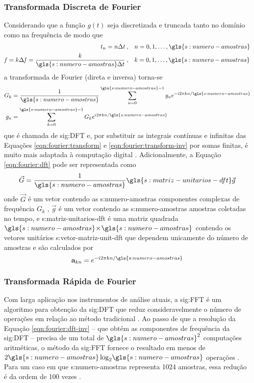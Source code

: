 \documentclass[12pt,oneside,english,brazil,lmodern,siglas,simbolos,cite=num]{ucsmonograph}
\begin{document}
	\subsubsection{Transformada Discreta de Fourier}
	Considerando que a função $g(t)$ seja discretizada e truncada tanto no domínio como na frequência de modo que
	\begin{align*}
		t_n = n\Delta t\: ,&\quad n = 0, 1, \dots , \gls{s:numero-amostras}\\
		\mathit{f} = k\Delta\mathit{f} = \frac{k}{\gls{s:numero-amostras}\Delta t}\: ,&\quad k = 0, 1, \dots , \gls{s:numero-amostras}
	\end{align*}
	a transformada de Fourier (direta e inversa) torna-se \cite{randall:1987}
	\begin{align}
		G_k &= \frac{1}{\gls{s:numero-amostras}}\sum_{n=0}^{\gls{s:numero-amostras}-1}g_n e^{-i 2\pi k n/\gls{s:numero-amostras}} \label{eqn:fourier:dft}\\
		g_n &= \sum_{k=0}^{\gls{s:numero-amostras}-1}G_k e^{i 2\pi k n/\gls{s:numero-amostras}} \label{eqn:fourier:dft-inv}
	\end{align}
	que é chamada de \gls{sig:DFT} e, por substituir as integrais contínuas e infinitas das Equações \ref{eqn:fourier:transform} e \ref{eqn:fourier:transform-inv} por somas finitas, é muito mais adaptada à computação digital \cite{randall:1987}.
	Adicionalmente, a Equação \ref{eqn:fourier:dft} pode ser representada como \cite{dimarogonas:1995}
	\begin{equation} \label{eqn:fourier:dft-matricial}
		\vec{G} = \frac{1}{\gls{s:numero-amostras}}\gls{s:matriz-unitarios-dft}\vec{g}
	\end{equation}
	onde $ \vec{G} $ é um vetor contendo as \gls{s:numero-amostras} componentes complexas de frequência $ G_k $ , $ \vec{g} $ é um vetor contendo as \gls{s:numero-amostras} amostras coletadas no tempo, e \gls{s:matriz-unitarios-dft} é uma matriz quadrada $ \gls{s:numero-amostras}\! \times\!	\gls{s:numero-amostras} $ contendo os vetores unitários \gls{s:vetor-matriz-unit-dft} que dependem unicamente do número de amostras e são calculados por
	\begin{equation}
		\textbf{a}_{kn} = e^{-i2\pi kn/\gls{s:numero-amostras}}
	\end{equation}
	
	\subsubsection{Transformada Rápida de Fourier}
	Com larga aplicação nos instrumentos de análise atuais, a \gls{sig:FFT} é um algoritmo para obtenção da \gls{sig:DFT} que reduz consideravelmente o número de operações em relação ao método tradicional \cite{randall:1987}.
	Ao passo de que a resolução da Equação \ref{eqn:fourier:dft-inv} -- que obtém as componentes de frequência da \gls{sig:DFT} -- precisa de um total de $ \gls{s:numero-amostras}^2 $ computações aritméticas, o método da \gls{sig:FFT} fornece o resultado em menos de $ 2\gls{s:numero-amostras} \log_2\! \gls{s:numero-amostras} $ operações \cite{cooley:1965}.
	Para um caso em que \gls{s:numero-amostras} representa 1024 amostras, essa redução é da ordem de 100 vezes \cite{randall:1987}.	
	
\end{document}
